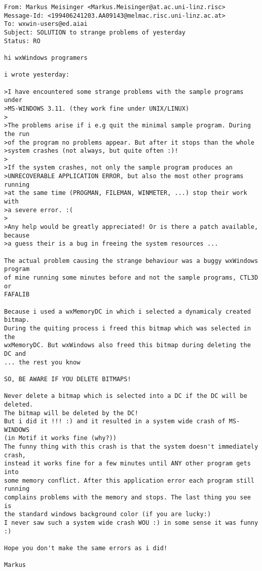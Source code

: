 \begin{verbatim}
From: Markus Meisinger <Markus.Meisinger@at.ac.uni-linz.risc>
Message-Id: <199406241203.AA09143@melmac.risc.uni-linz.ac.at>
To: wxwin-users@ed.aiai
Subject: SOLUTION to strange problems of yesterday
Status: RO

hi wxWindows programers

i wrote yesterday:

>I have encountered some strange problems with the sample programs under
>MS-WINDOWS 3.11. (they work fine under UNIX/LINUX)
>
>The problems arise if i e.g quit the minimal sample program. During the run
>of the program no problems appear. But after it stops than the whole
>system crashes (not always, but quite often :)!
>
>If the system crashes, not only the sample program produces an
>UNRECOVERABLE APPLICATION ERROR, but also the most other programs running
>at the same time (PROGMAN, FILEMAN, WINMETER, ...) stop their work with
>a severe error. :(
>
>Any help would be greatly appreciated! Or is there a patch available, because
>a guess their is a bug in freeing the system resources ...

The actual problem causing the strange behaviour was a buggy wxWindows program
of mine running some minutes before and not the sample programs, CTL3D or
FAFALIB

Because i used a wxMemoryDC in which i selected a dynamicaly created bitmap.
During the quiting process i freed this bitmap which was selected in the
wxMemoryDC. But wxWindows also freed this bitmap during deleting the DC and
... the rest you know

SO, BE AWARE IF YOU DELETE BITMAPS! 

Never delete a bitmap which is selected into a DC if the DC will be deleted.
The bitmap will be deleted by the DC!
But i did it !!! :) and it resulted in a system wide crash of MS-WINDOWS
(in Motif it works fine (why?))
The funny thing with this crash is that the system doesn't immediately crash,
instead it works fine for a few minutes until ANY other program gets into
some memory conflict. After this application error each program still running
complains problems with the memory and stops. The last thing you see is
the standard windows background color (if you are lucky:)
I never saw such a system wide crash WOU :) in some sense it was funny :)

Hope you don't make the same errors as i did!

Markus
\end{verbatim}

